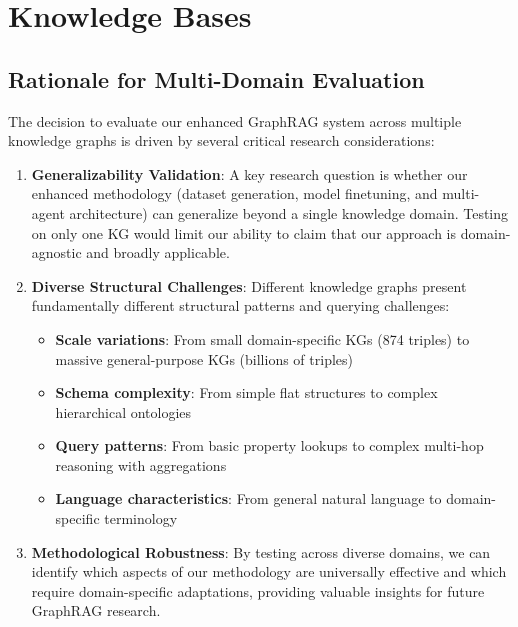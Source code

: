 
\section{Knowledge Bases} \label{knowledgebase}

\subsection{Rationale for Multi-Domain Evaluation}

The decision to evaluate our enhanced GraphRAG system across multiple knowledge graphs is driven by several critical research considerations:

\begin{enumerate}
    \item \textbf{Generalizability Validation}: A key research question is whether our enhanced methodology (dataset generation, model finetuning, and multi-agent architecture) can generalize beyond a single knowledge domain. Testing on only one KG would limit our ability to claim that our approach is domain-agnostic and broadly applicable.
    
    \item \textbf{Diverse Structural Challenges}: Different knowledge graphs present fundamentally different structural patterns and querying challenges:
    \begin{itemize}
        \item \textbf{Scale variations}: From small domain-specific KGs (874 triples) to massive general-purpose KGs (billions of triples)
        \item \textbf{Schema complexity}: From simple flat structures to complex hierarchical ontologies
        \item \textbf{Query patterns}: From basic property lookups to complex multi-hop reasoning with aggregations
        \item \textbf{Language characteristics}: From general natural language to domain-specific terminology
    \end{itemize}
    
    \item \textbf{Methodological Robustness}: By testing across diverse domains, we can identify which aspects of our methodology are universally effective and which require domain-specific adaptations, providing valuable insights for future GraphRAG research.
\end{enumerate}

